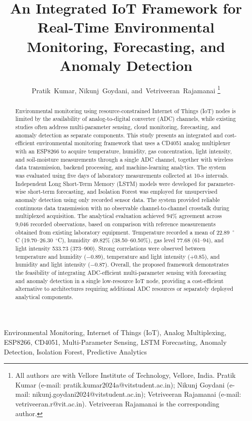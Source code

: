 ﻿\documentclass[journal]{IEEEtran}
\title{An Integrated IoT Framework for Real-Time Environmental Monitoring, Forecasting, and Anomaly Detection}
\author{
Pratik~Kumar,
Nikunj~Goydani,
and~Vetriveeran~Rajamanai
\thanks{
All authors are with Vellore Institute of Technology, Vellore, India.
Pratik Kumar (e-mail: pratik.kumar2024a@vitstudent.ac.in);
Nikunj Goydani (e-mail: nikunj.goydani2024@vitstudent.ac.in);
Vetriveeran Rajamanai (e-mail: vetriveeran.r@vit.ac.in).
Vetriveeran Rajamanai is the corresponding author.
}
}
\begin{document}
\maketitle

\begin{abstract}
Environmental monitoring using resource-constrained Internet of Things (IoT)
nodes is limited by the availability of analog-to-digital converter (ADC)
channels, while existing studies often address multi-parameter sensing, cloud
monitoring, forecasting, and anomaly detection as separate components. This
study presents an integrated and cost-efficient environmental monitoring
framework that uses a CD4051 analog multiplexer with an ESP8266 to acquire
temperature, humidity, gas concentration, light intensity, and soil-moisture
measurements through a single ADC channel, together with wireless data
transmission, backend processing, and machine-learning analytics. The system
was evaluated using five days of laboratory measurements collected at 10-s
intervals. Independent Long Short-Term Memory (LSTM) models were developed
for parameter-wise short-term forecasting, and Isolation Forest was employed
for unsupervised anomaly detection using only recorded sensor data. The system
provided reliable continuous data transmission with no observable
channel-to-channel crosstalk during multiplexed acquisition. The analytical
evaluation achieved 94\% agreement across 9,046 recorded observations, based
on comparison with reference measurements obtained from existing laboratory
equipment. Temperature recorded a mean of 22.89~$^\circ$C
(19.70--26.30~$^\circ$C), humidity 49.82\% (38.50--60.50\%), gas level
77.68 (61--94), and light intensity 533.73 (373--900). Strong correlations
were observed between temperature and humidity ($-0.89$), temperature and
light intensity ($+0.85$), and humidity and light intensity ($-0.87$).
Overall, the proposed framework demonstrates the feasibility of integrating
ADC-efficient multi-parameter sensing with forecasting and anomaly detection
in a single low-resource IoT node, providing a cost-efficient alternative to
architectures requiring additional ADC resources or separately deployed
analytical components.
\end{abstract}

\begin{IEEEkeywords}
Environmental Monitoring, Internet of Things (IoT), Analog Multiplexing,
ESP8266, CD4051, Multi-Parameter Sensing, LSTM Forecasting,
Anomaly Detection, Isolation Forest, Predictive Analytics
\end{IEEEkeywords}
\end{document}
